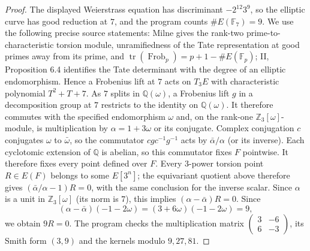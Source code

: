 \documentclass[11pt,a4paper]{article}
\begin{document}
\begin{proof}
The displayed Weierstrass equation has discriminant $-2^{12}3^9$, so
the elliptic curve has good reduction at $7$, and the program counts
$\#E(\mathbb F_7)=9$.  We use the following precise source statements:
Milne \cite[II, Proposition 6.3; V, Propositions 8.1 and 8.3]{D_MilneEC}
gives the rank-two prime-to-characteristic torsion module, unramifiedness
of the Tate representation at good primes away from its prime, and
$\operatorname{tr}(\operatorname{Frob}_p)=p+1-\#E(\mathbb F_p)$;
II, Proposition 6.4 identifies the Tate determinant with the degree of
an elliptic endomorphism.  Hence a Frobenius lift at $7$ acts on $T_3E$
with characteristic polynomial $T^2+T+7$.  As $7$ splits in
$\mathbb Q(\omega)$, a Frobenius lift $g$ in a decomposition group at $7$
restricts to the identity on $\mathbb Q(\omega)$.  It therefore commutes
with the specified endomorphism $\omega$ and, on the rank-one
$\mathbb Z_3[\omega]$-module, is multiplication by
$\alpha=1+3\omega$ or its conjugate.
Complex conjugation $c$ conjugates $\omega$ to $\bar\omega$, so the
commutator $cgc^{-1}g^{-1}$ acts by
$\bar\alpha/\alpha$ (or its inverse).  Each cyclotomic extension of
$\mathbb Q$ is abelian, so this commutator fixes $F$ pointwise.  It
therefore fixes every point defined over $F$.  Every $3$-power torsion point
$R\in E(F)$ belongs to some $E[3^n]$; the equivariant quotient above
therefore gives $(\bar\alpha/\alpha-1)R=0$, with the same conclusion
for the inverse scalar.  Since $\alpha$ is a unit in
$\mathbb Z_3[\omega]$ (its norm is $7$), this implies
$(\alpha-\bar\alpha)R=0$.
Since
\[
 (\alpha-\bar\alpha)(-1-2\omega)
 =(3+6\omega)(-1-2\omega)=9,
\]
we obtain $9R=0$.  The program checks the multiplication matrix
$\left(\begin{smallmatrix}3&-6\\6&-3\end{smallmatrix}\right)$,
its Smith form $(3,9)$ and the kernels modulo $9,27,81$.


\end{proof}
\end{document}
